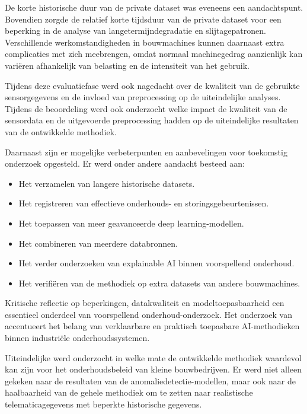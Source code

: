 De korte historische duur van de private dataset was eveneens een aandachtspunt. Bovendien zorgde de relatief korte tijdsduur van de private dataset voor een beperking in de analyse van langetermijndegradatie en slijtagepatronen. Verschillende werkomstandigheden in bouwmachines kunnen daarnaast extra complicaties met zich meebrengen, omdat normaal machinegedrag aanzienlijk kan variëren afhankelijk van belasting en de intensiteit van het gebruik.

Tijdens deze evaluatiefase werd ook nagedacht over de kwaliteit van de gebruikte sensorgegevens en de invloed van preprocessing op de uiteindelijke analyses. Tijdens de beoordeling werd ook onderzocht welke impact de kwaliteit van de sensordata en de uitgevoerde preprocessing hadden op de uiteindelijke resultaten van de ontwikkelde methodiek.

Daarnaast zijn er mogelijke verbeterpunten en aanbevelingen voor toekomstig onderzoek opgesteld. Er werd onder andere aandacht besteed aan:
\begin{itemize}
    \item Het verzamelen van langere historische datasets.
    
    \item Het registreren van effectieve onderhouds- en storingsgebeurtenissen.
    
    \item Het toepassen van meer geavanceerde deep learning-modellen.
    
    \item Het combineren van meerdere databronnen.
    
    \item Het verder onderzoeken van explainable AI binnen voorspellend onderhoud.
    
    \item Het verifiëren van de methodiek op extra datasets van andere bouwmachines.
\end{itemize}

Kritische reflectie op beperkingen, datakwaliteit en modeltoepasbaarheid een essentieel onderdeel van voorspellend onderhoud-onderzoek. Het onderzoek van \textcite{Matzka2020} accentueert het belang van verklaarbare en praktisch toepasbare AI-methodieken binnen industriële onderhoudssystemen.

Uiteindelijke werd onderzocht in welke mate de ontwikkelde methodiek waardevol kan zijn voor het onderhoudsbeleid van kleine bouwbedrijven. Er werd niet alleen gekeken naar de resultaten van de anomaliedetectie-modellen, maar ook naar de haalbaarheid van de gehele methodiek om te zetten naar realistische telematicagegevens met beperkte historische gegevens.

